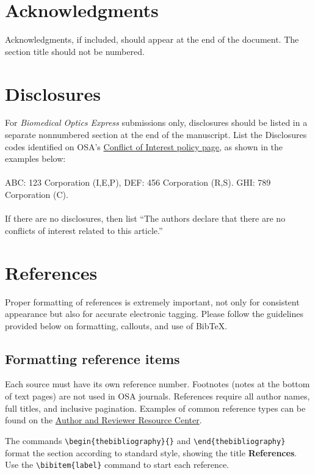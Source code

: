 \documentclass{osa-article}
\begin{document}
\section*{Acknowledgments}
Acknowledgments, if included, should appear at the end of the document. The section title should not be numbered.

\section*{Disclosures}
For \textit{Biomedical Optics Express} submissions only, disclosures should be listed in a separate nonnumbered section at the end of the manuscript. List the Disclosures codes identified on OSA's \href{http://www.osapublishing.org/submit/review/conflicts-interest-policy.cfm}{Conflict of Interest policy page}, as shown in the examples below:\\
\\
ABC: 123 Corporation (I,E,P), DEF: 456 Corporation (R,S). GHI: 789 Corporation (C).\\
\\
If there are no disclosures, then list ``The authors declare that there are no conflicts of interest related to this article.''


\section{References}
\label{sec:refs}
Proper formatting of references is extremely important, not only for consistent appearance but also for accurate electronic tagging. Please follow the guidelines provided below on formatting, callouts, and use of Bib\TeX.

\subsection{Formatting reference items}
Each source must have its own reference number. Footnotes (notes at the bottom of text pages) are not used in OSA journals. References require all author names, full titles, and inclusive pagination. Examples of common reference types can be found on the  \href{http://www.osapublishing.org/submit/style/style_traditional_journals.cfm} {Author and Reviewer Resource Center}.


The commands \verb+\begin{thebibliography}{}+ and \verb+\end{thebibliography}+ format the section according to standard style, showing the title {\bfseries References}.  Use the \verb+\bibitem{label}+ command to start each reference.
\end{document}
